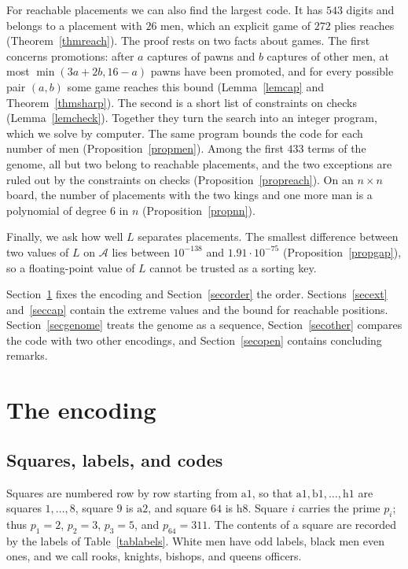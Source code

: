 \documentclass[12pt,reqno]{article}
\newcommand{\adm}{\mathcal{A}}
\newcommand{\sq}[1]{\mathrm{#1}}
\begin{document}
For reachable placements we can also find the largest code. It has $543$ digits and belongs to
a placement with $26$ men, which an explicit game of $272$ plies reaches
(Theorem~\ref{thmreach}). The proof rests on two facts about games. The first concerns
promotions: after $a$ captures of pawns and $b$ captures of other men, at most
$\min(3a+2b,16-a)$ pawns have been promoted, and for every possible pair $(a,b)$ some game
reaches this bound (Lemma~\ref{lemcap} and Theorem~\ref{thmsharp}). The second is a short list of
constraints on checks (Lemma~\ref{lemcheck}). Together they turn the search into an integer
program, which we solve by computer. The same program bounds the code for each number of men
(Proposition~\ref{propmen}). Among the first $433$ terms of the genome, all but two belong to
reachable placements, and the two exceptions are ruled out by the constraints on checks
(Proposition~\ref{propreach}). On an $n\times n$ board, the number of placements with the two
kings and one more man is a polynomial of degree $6$ in $n$ (Proposition~\ref{propnn}).

Finally, we ask how well $L$ separates placements. The smallest difference between two values of
$L$ on $\adm$ lies between $10^{-138}$ and $1.91\cdot 10^{-75}$ (Proposition~\ref{propgap}), so a
floating-point value of $L$ cannot be trusted as a sorting key.

Section~\ref{secenc} fixes the encoding and Section~\ref{secorder} the order. Sections~\ref{secext}
and~\ref{seccap} contain the extreme values and the bound for reachable positions.
Section~\ref{secgenome} treats the genome as a sequence, Section~\ref{secother} compares the
code with two other encodings, and Section~\ref{secopen} contains concluding remarks.

\section{The encoding}\label{secenc}

\subsection{Squares, labels, and codes}

Squares are numbered row by row starting from $\sq{a1}$, so that $\sq{a1},\sq{b1},\ldots,\sq{h1}$
are squares $1,\ldots,8$, square $9$ is $\sq{a2}$, and square $64$ is $\sq{h8}$. Square $i$ carries
the prime $p_i$; thus $p_1=2$, $p_2=3$, $p_3=5$, and $p_{64}=311$. The contents of a square are
recorded by the labels of Table~\ref{tablabels}. White men have odd labels, black men even ones,
and we call rooks, knights, bishops, and queens officers.
\end{document}
